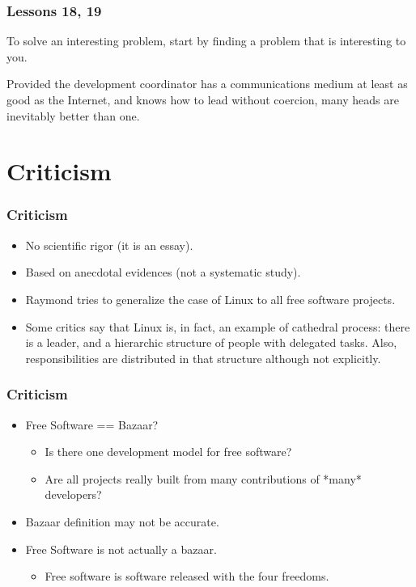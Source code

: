 \documentclass{beamer}
\begin{document}
\begin{frame}
\frametitle{Lessons 18, 19}

\begin{center}
{\large To solve an interesting problem, start by finding a problem
  that is interesting to you.}
\end{center}

\begin{center}
{\large Provided the development coordinator has a communications
  medium at least as good as the Internet, and knows how to lead
  without coercion, many heads are inevitably better than one.}
\end{center}

\end{frame}

\section{Criticism}

\begin{frame}
\frametitle{Criticism}

\begin{itemize}
\item No scientific rigor (it is an essay).
\item Based on anecdotal evidences (not a systematic study).
\item Raymond tries to generalize the case of Linux to all free
  software projects.
\item Some critics say that Linux is, in fact, an example of cathedral
  process: there is a leader, and a hierarchic structure of people
  with delegated tasks. Also, responsibilities are distributed in that
  structure although not explicitly.
\end{itemize}

\end{frame}

\begin{frame}
\frametitle{Criticism}

\begin{itemize}
\item Free Software == Bazaar?
\begin{itemize}
\item Is there one development model for free software?
\item Are all projects really built from many contributions of *many*
  developers?
\end{itemize}
\item Bazaar definition may not be accurate.

\item Free Software is not actually a bazaar.

\begin{itemize}
\item Free software is software released with the four freedoms.
\end{itemize}

\end{itemize}

\end{frame}
\end{document}
